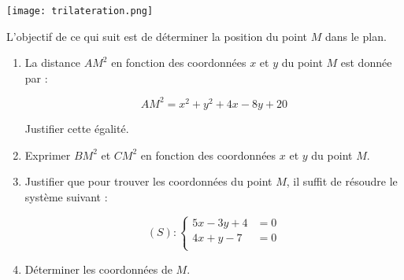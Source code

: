 \documentclass[a4paper]{article}
\begin{document}
\begin{enumerate}
\begin{itemize}
	\begin{center}
	  \texttt{[image: trilateration.png]}
	\end{center}

	\pagebreak

	L'objectif de ce qui suit est de déterminer la position du point $M$ dans le plan.

    \end{itemize}

    \begin{enumerate}
      \item La distance $AM^2$ en fonction des coordonnées $x$ et $y$ du point $M$ est donnée par : 

	\[AM^2 = x^2+y^2+4x-8y+20\]

	Justifier cette égalité.

      \item Exprimer $BM^2$ et $CM^2$ en fonction des coordonnées $x$ et $y$ du point $M$.


	\item Justifier que pour trouver les coordonnées du point $M$, il suffit de résoudre le système suivant :

	  \[
	    (S) : \left\{
	      \begin{aligned}
		5x - 3y +4 &= 0 \\
		4x + y -7  &= 0 \\
	    \end{aligned}\right.
	  \]

	  \dotfill{}

	\item Déterminer les coordonnées de $M$.


\end{enumerate}
\end{enumerate}
\end{document}
